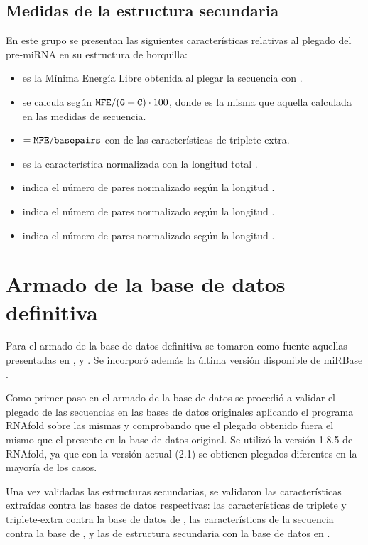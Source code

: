 \documentclass[12pt,bibliography=oldstyle,DIV=12,parskip=half-,titlepage]{scrartcl}
\begin{document}
\subsection{Medidas de la estructura secundaria}
En este grupo se presentan las siguientes características relativas al
plegado del pre-miRNA en su estructura de horquilla:
\begin{itemize}
\item{} es la Mínima Energía Libre obtenida al plegar la
  secuencia con .
\item{} se calcula según ${{\tt MFE}}/{({\tt G+C})\cdot
  100}$, donde  es la misma que aquella calculada en las
  medidas de secuencia.
\item{}$={\tt MFE}/{\tt basepairs}$ con 
  de las características de triplete extra.
\item{} es la característica  normalizada con
  la longitud total .
\item{} indica el número de pares 
  normalizado según la longitud .
\item{} indica el número de pares 
  normalizado según la longitud .
\item{} indica el número de pares 
  normalizado según la longitud .
\end{itemize}
%
%
%
%
\section{Armado de la base de datos definitiva}
Para el armado de la base de datos definitiva se tomaron como fuente
aquellas presentadas en \cite{xue}, \cite{ng} y \cite{batuwita}.
Se incorporó además la última versión disponible de miRBase \cite{mirbase}.

Como primer paso en el armado de la base de datos se
procedió a validar el plegado de las secuencias en las bases de datos
originales aplicando el programa RNAfold sobre las mismas y
comprobando que el plegado obtenido fuera el mismo que el presente en
la base de datos original. Se utilizó la versión 1.8.5 de RNAfold, ya
que con la versión actual (2.1) se obtienen plegados diferentes en la
mayoría de los casos.

Una vez validadas las estructuras secundarias, se validaron las
características extraídas contra las bases de datos respectivas: las
características de triplete y triplete-extra contra la base de datos
de \cite{xue}, las características de la secuencia contra la base de
\cite{ng}, y las de estructura secundaria con la base de datos en
\cite{batuwita}.
\end{document}
